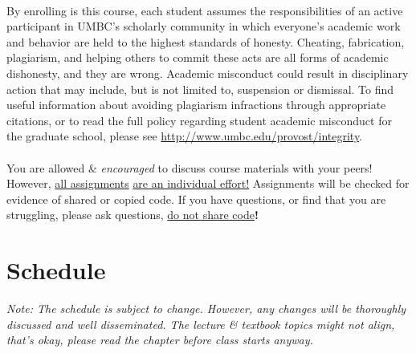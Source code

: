 \documentclass[letter,11pt]{article}
\begin{document}
\paragraph{}By enrolling is this course, each student assumes the responsibilities of an active participant in UMBC's scholarly community in which everyone's academic work and behavior are held to the highest standards of honesty. Cheating, fabrication, plagiarism, and helping others to commit these acts are all forms of academic dishonesty, and they are wrong. Academic misconduct could result in disciplinary action that may include, but is not limited to, suspension or dismissal. To find useful information about avoiding plagiarism infractions through appropriate citations, or to read the full policy regarding student academic misconduct for the graduate school, please see \url{http://www.umbc.edu/provost/integrity}.

\paragraph{}You are allowed \& \textit{encouraged} to discuss course materials with your peers! However, \underline{all assignments} \underline{are an individual effort!} Assignments will be checked for evidence of shared or copied code. If you have questions, or find that you are struggling, please ask questions, \underline{do not share code}\textbf{!}

\section*{Schedule}
\textit{Note: The schedule is subject to change. However, any changes will be thoroughly discussed and well disseminated. The lecture \& textbook topics might not align, that's okay, please read the chapter before class starts anyway.}
\end{document}
